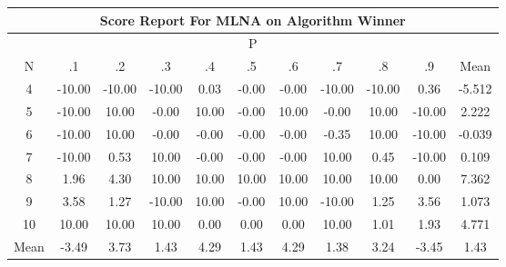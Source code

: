 \documentclass[11pt,a4paper]{report}
\begin{document}
\begin{longtable}{ | c || c | c | c | c | c | c | c | c | c || c |}
\hline
\multicolumn{11}{|c|}{ Score Report For MLNA on Algorithm Winner} \\
\hline
\multicolumn{11}{|c|}{ P } \\
\hline
N & .1 & .2 & .3 & .4 & .5 & .6 & .7 & .8 & .9 & Mean\\
 \hline
 \hline
 \endhead
  4 &  \cellcolor[HTML]{FF0000} -10.00 &  \cellcolor[HTML]{FF0000} -10.00 &  \cellcolor[HTML]{FF0000} -10.00 &  \cellcolor[HTML]{FFFFFF} 0.03 &  \cellcolor[HTML]{FFFFFF} -0.00 &  \cellcolor[HTML]{FFFFFF} -0.00 &  \cellcolor[HTML]{FF0000} -10.00 &  \cellcolor[HTML]{FF0000} -10.00 &  \cellcolor[HTML]{F7F7FF} 0.36 & -5.512 \\
  5 &  \cellcolor[HTML]{FF0000} -10.00 &  \cellcolor[HTML]{0808FF} 10.00 &  \cellcolor[HTML]{FFFFFF} -0.00 &  \cellcolor[HTML]{0808FF} 10.00 &  \cellcolor[HTML]{FFFFFF} -0.00 &  \cellcolor[HTML]{0808FF} 10.00 &  \cellcolor[HTML]{FFFFFF} -0.00 &  \cellcolor[HTML]{0808FF} 10.00 &  \cellcolor[HTML]{FF0000} -10.00 & 2.222 \\
  6 &  \cellcolor[HTML]{FF0000} -10.00 &  \cellcolor[HTML]{0808FF} 10.00 &  \cellcolor[HTML]{FFFFFF} -0.00 &  \cellcolor[HTML]{FFFFFF} -0.00 &  \cellcolor[HTML]{FFFFFF} -0.00 &  \cellcolor[HTML]{FFFFFF} -0.00 &  \cellcolor[HTML]{FFF7F7} -0.35 &  \cellcolor[HTML]{0808FF} 10.00 &  \cellcolor[HTML]{FF0000} -10.00 & -0.039 \\
  7 &  \cellcolor[HTML]{FF0000} -10.00 &  \cellcolor[HTML]{EFEFFF} 0.53 &  \cellcolor[HTML]{0808FF} 10.00 &  \cellcolor[HTML]{FFFFFF} -0.00 &  \cellcolor[HTML]{FFFFFF} -0.00 &  \cellcolor[HTML]{FFFFFF} -0.00 &  \cellcolor[HTML]{0808FF} 10.00 &  \cellcolor[HTML]{F7F7FF} 0.45 &  \cellcolor[HTML]{FF0000} -10.00 & 0.109 \\
  8 &  \cellcolor[HTML]{CFCFFF} 1.96 &  \cellcolor[HTML]{8F8FFF} 4.30 &  \cellcolor[HTML]{0808FF} 10.00 &  \cellcolor[HTML]{0808FF} 10.00 &  \cellcolor[HTML]{0808FF} 10.00 &  \cellcolor[HTML]{0808FF} 10.00 &  \cellcolor[HTML]{0808FF} 10.00 &  \cellcolor[HTML]{0808FF} 10.00 &  \cellcolor[HTML]{FFFFFF} 0.00 & 7.362 \\
  9 &  \cellcolor[HTML]{A7A7FF} 3.58 &  \cellcolor[HTML]{DFDFFF} 1.27 &  \cellcolor[HTML]{FF0000} -10.00 &  \cellcolor[HTML]{0808FF} 10.00 &  \cellcolor[HTML]{FFFFFF} -0.00 &  \cellcolor[HTML]{0808FF} 10.00 &  \cellcolor[HTML]{FF0000} -10.00 &  \cellcolor[HTML]{DFDFFF} 1.25 &  \cellcolor[HTML]{A7A7FF} 3.56 & 1.073 \\
  10 &  \cellcolor[HTML]{0808FF} 10.00 &  \cellcolor[HTML]{0808FF} 10.00 &  \cellcolor[HTML]{0808FF} 10.00 &  \cellcolor[HTML]{FFFFFF} 0.00 &  \cellcolor[HTML]{FFFFFF} 0.00 &  \cellcolor[HTML]{FFFFFF} 0.00 &  \cellcolor[HTML]{0808FF} 10.00 &  \cellcolor[HTML]{E7E7FF} 1.01 &  \cellcolor[HTML]{CFCFFF} 1.93 & 4.771 \\
 \hline
 \hline
Mean &  \cellcolor[HTML]{FFA7A7} -3.49 &  \cellcolor[HTML]{9F9FFF} 3.73 &  \cellcolor[HTML]{DFDFFF} 1.43 &  \cellcolor[HTML]{8F8FFF} 4.29 &  \cellcolor[HTML]{DFDFFF} 1.43 &  \cellcolor[HTML]{9797FF} 4.29 &  \cellcolor[HTML]{DFDFFF} 1.38 &  \cellcolor[HTML]{AFAFFF} 3.24 &  \cellcolor[HTML]{FFA7A7} -3.45 &  \cellcolor[HTML]{DFDFFF} 1.43
\end{longtable}
\end{document}
